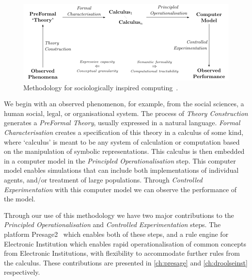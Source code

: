 \begin{figure}
\includegraphics[width=\linewidth]{gfx/sic}
\caption[Methodology for sociologically inspired computing.]{Methodology for sociologically inspired computing~\citep{Jones2013}.}\label{fig:sic}
\end{figure}

We begin with an observed phenomenon, for example, from the social sciences, a human social, legal, or organisational system. The process of \emph{Theory Construction} generates a \emph{PreFormal Theory}, usually expressed in a natural language. \emph{Formal Characterisation} creates a specification of this theory in a calculus of some kind, where `calculus' is meant to be any system of calculation or computation based on the manipulation of symbolic representations. This calculus is then embedded in a computer model in the \emph{Principled Operationalisation} step. This computer model enables simulations that can include both implementations of individual agents, and/or treatment of large populations. Through \emph{Controlled Experimentation} with this computer model we can observe the performance of the model.

Through our use of this methodology we have two major contributions to the \emph{Principled Operationalisation} and \emph{Controlled Experimentation} steps. The platform Presage2~\citep{Macbeth2014} which enables both of these steps, and a rule engine for Electronic Institution which enables rapid operationalisation of common concepts from Electronic Institutions, with flexibility to accommodate further rules from the calculus. These contributions are presented in \autoref{ch:presage} and \autoref{ch:droolseinst} respectively.
